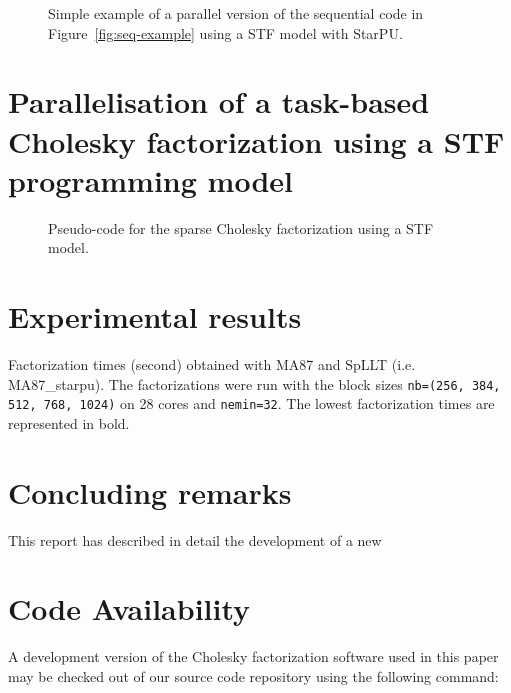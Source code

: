 \documentclass{article}
\newcommand{\starpu}{{StarPU}\xspace}
\begin{document}
\begin{figure}[!h]
  \centering 
  \caption{\label{fig:stf-starpu-example}Simple example of a parallel version
    of the sequential code in Figure~\ref{fig:seq-example} using a STF
    model with \starpu.}
\end{figure}

\section{Parallelisation of a task-based Cholesky factorization using a STF programming model}
\label{sec:experiments}


\begin{figure}[!h]
  \centering 
\caption{\label{fig:activation-pseudocode-1d}Pseudo-code for the
  sparse Cholesky factorization using a STF model.}
\end{figure}

\section{Experimental results}\label{sec:experiments}

\begin{table}[htbp]
    \begin{center}
      
    \end{center}
    \caption{Factorization times (second) obtained with MA87 and SpLLT
      (i.e. MA87\_starpu). The factorizations were run with the block
      sizes \texttt{nb=(256, 384, 512, 768, 1024)} on 28 cores and
      \texttt{nemin=32}. The lowest factorization times are
      represented in bold.}
\end{table}

\section{Concluding remarks}\label{sec:conclusions}
This report has described in detail the development of a new

 
\section*{Code Availability}
A development version of the Cholesky factorization software used in this 
paper may be checked out of
our source code repository using the following command:
\end{document}
